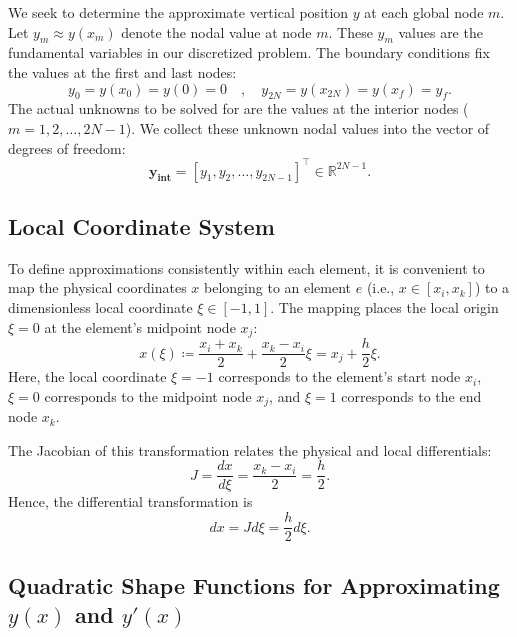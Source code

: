 \documentclass[11pt]{article}
\begin{document}
    We seek to determine the approximate vertical position \( y \) at each global node \(m\). Let \( y_m \approx y(x_m) \) denote the nodal value at node \(m\). These \( y_m \) values are the fundamental variables in our discretized problem. The boundary conditions fix the values at the first and last nodes:
    \[ y_{0} = y(x_{0}) = y(0) = 0 \quad , \quad y_{2N} = y(x_{2N}) = y(x_f) = y_f. \]
    The actual unknowns to be solved for are the values at the interior nodes ($m = 1, 2, \ldots, 2N-1$). We collect these unknown nodal values into the vector of degrees of freedom:
    \begin{equation}
    \mathbf{y_\text{int}} = \left[ y_1, y_2, \ldots, y_{2N-1} \right]^\top \in \mathbb{R}^{2N-1}.
    \label{eq:yint}
    \end{equation}

\subsection{Local Coordinate System}
    
    To define approximations consistently within each element, it is convenient to map the physical coordinates \( x \) belonging to an element \(e\) (i.e., \(x \in [x_i, x_k]\)) to a dimensionless local coordinate \( \xi \in \left[-1,1\right] \). The mapping places the local origin \( \xi = 0 \) at the element's midpoint node \( x_j \):
    \begin{equation}
        x(\xi) \coloneqq \frac{x_{i} + x_k}{2} + \frac{x_k - x_{i}}{2} \xi =  x_j + \frac{h}{2} \xi. \label{eq:x(xi)}
    \end{equation}
    Here, the local coordinate \( \xi = -1 \) corresponds to the element's start node \( x_{i} \), \( \xi = 0 \) corresponds to the midpoint node \( x_j \), and \( \xi = 1 \) corresponds to the end node \( x_k \).
    
    The Jacobian of this transformation relates the physical and local differentials:
    \[ J = \frac{dx}{d\xi} = \frac{x_k - x_i}{2} = \frac{h}{2}. \]
    Hence, the differential transformation is
    \[
        dx = J d\xi = \frac{h}{2} d\xi.
    \]
    
\subsection{Quadratic Shape Functions for Approximating \( y(x) \) and \( y'(x) \) }
    
\end{document}

